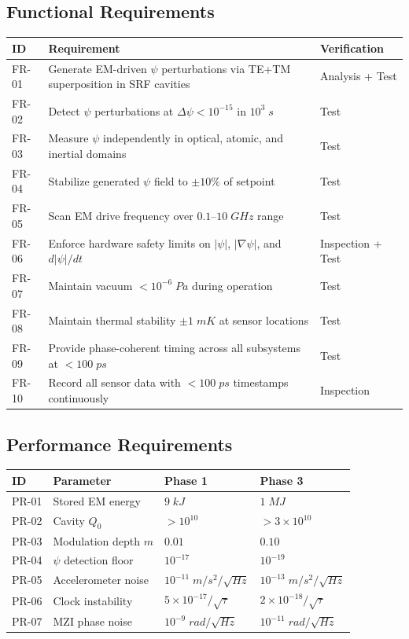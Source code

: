 \documentclass[11pt,a4paper]{article}
\begin{document}
\subsection{Functional Requirements}

\begin{longtable}{p{}p{}p{}}
\toprule
\textbf{ID} & \textbf{Requirement} & \textbf{Verification} \\
\midrule
\endhead
FR-01 & Generate EM-driven $\psi$ perturbations via TE+TM
superposition in SRF cavities & Analysis + Test \\
FR-02 & Detect $\psi$ perturbations at $\Delta\psi < 10^{-15}$
in $10^3\;\si{s}$ & Test \\
FR-03 & Measure $\psi$ independently in optical, atomic, and
inertial domains & Test \\
FR-04 & Stabilize generated $\psi$ field to $\pm 10\%$ of
setpoint & Test \\
FR-05 & Scan EM drive frequency over $0.1$--$10\;\si{GHz}$
range & Test \\
FR-06 & Enforce hardware safety limits on $|\psi|$,
$|\nabla\psi|$, and $d|\psi|/dt$ & Inspection + Test \\
FR-07 & Maintain vacuum $< 10^{-6}\;\si{Pa}$ during
operation & Test \\
FR-08 & Maintain thermal stability $\pm 1\;\si{mK}$ at
sensor locations & Test \\
FR-09 & Provide phase-coherent timing across all subsystems
at $< 100\;\si{ps}$ & Test \\
FR-10 & Record all sensor data with $< 100\;\si{ps}$
timestamps continuously & Inspection \\
\bottomrule
\end{longtable}

\subsection{Performance Requirements}

\begin{longtable}{p{}p{}p{}p{}}
\toprule
\textbf{ID} & \textbf{Parameter} & \textbf{Phase 1} & \textbf{Phase 3} \\
\midrule
\endhead
PR-01 & Stored EM energy & $9\;\si{kJ}$ & $1\;\si{MJ}$ \\
PR-02 & Cavity $Q_0$ & $> 10^{10}$ & $> 3 \times 10^{10}$ \\
PR-03 & Modulation depth $m$ & $0.01$ & $0.10$ \\
PR-04 & $\psi$ detection floor & $10^{-17}$ & $10^{-19}$ \\
PR-05 & Accelerometer noise & $10^{-11}\;\si{m/s^2/\sqrt{Hz}}$ &
$10^{-13}\;\si{m/s^2/\sqrt{Hz}}$ \\
PR-06 & Clock instability & $5 \times 10^{-17}/\sqrt{\tau}$ &
$2 \times 10^{-18}/\sqrt{\tau}$ \\
PR-07 & MZI phase noise & $10^{-9}\;\si{rad/\sqrt{Hz}}$ &
$10^{-11}\;\si{rad/\sqrt{Hz}}$ \\
\bottomrule
\end{longtable}
\end{document}
